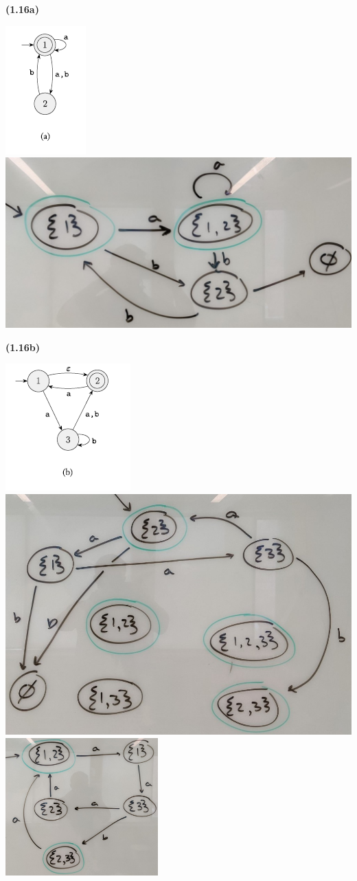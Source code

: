 \documentclass[11pt]{article}
\begin{document}
\textbf{(1.16a)}
\begin{center}
    \includegraphics[width = .2\linewidth]{images/1.16a.PNG}
    \hspace{.1\linewidth}
    \includegraphics[width = .6\linewidth]{images/homework02/answer1.16a.jpg}
\end{center}


\textbf{(1.16b)}
\begin{center}
    \includegraphics[width = .3\linewidth]{images/1.16b.PNG}
    \hspace{.1\linewidth}
    \includegraphics[width = .5\linewidth]{images/homework02/answer1.16b1.jpg}\\
    \bigbreak
    \includegraphics[height = 150pt]{images/homework02/answer1.16b2.jpg}\\
\end{center}
\end{document}
